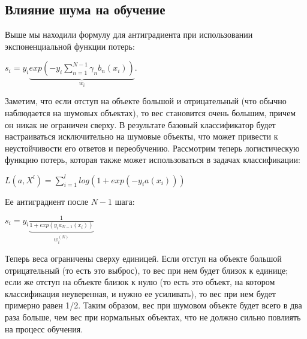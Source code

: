 \documentclass{article}
\begin{document}
\subsection{Влияние шума на обучение}

Выше мы находили формулу для антиградиента при использовании экспоненциальной функции потерь:

$s_i=y_i\underbrace{exp\left(-y_i\sum_{n=1}^{N-1}\gamma_nb_n(x_i)\right)}_{w_i}$.

Заметим, что если отступ на объекте большой и отрицательный (что обычно наблюдается на шумовых объектах), то вес становится очень большим, причем он никак не ограничен сверху. В результате базовый классификатор будет настраиваться исключительно на шумовые объекты, что может привести к неустойчивости его ответов и переобучению.
Рассмотрим теперь логистическую функцию потерь, которая также может использоваться в задачах классификации:

$L(a,X^l) = \sum_{i=1}^{l}log(1+exp(-y_ia(x_i)))$

Ее антиградиент после $N-1$ шага:

$s_i = y_i \underbrace{\frac{1}{1+exp(y_ia_{N-1}(x_i))}}_{w_i^{(N)}}$

Теперь веса ограничены сверху единицей. Если отступ на объекте большой отрицательный (то есть это выброс), то вес при нем будет близок к единице; если же отступ на объекте близок к нулю (то есть это объект, на котором классификация неуверенная, и нужно ее усиливать), то вес при нем будет примерно равен 1/2. Таким образом,
вес при шумовом объекте будет всего в два раза больше, чем вес при нормальных объектах, что не должно сильно повлиять на процесс обучения.
\end{document}
